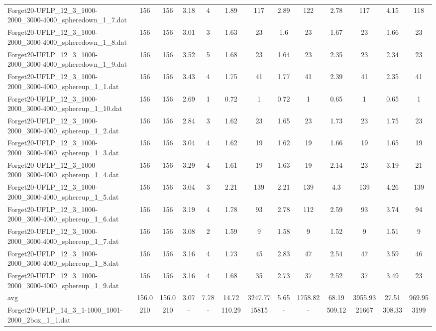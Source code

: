 \begin{table}[!ht]
{\begin{tabular}{lcccccccccccc}
Forget20-UFLP\_12\_3\_1000-2000\_3000-4000\_spheredown\_1\_7.dat & 156 & 156 & 3.18 & 4 & 1.89 & 117 & 2.89 & 122 & 2.78 & 117 & 4.15 & 118 \\
Forget20-UFLP\_12\_3\_1000-2000\_3000-4000\_spheredown\_1\_8.dat & 156 & 156 & 3.01 & 3 & 1.63 & 23 & 1.6 & 23 & 1.67 & 23 & 1.66 & 23 \\
Forget20-UFLP\_12\_3\_1000-2000\_3000-4000\_spheredown\_1\_9.dat & 156 & 156 & 3.52 & 5 & 1.68 & 23 & 1.64 & 23 & 2.35 & 23 & 2.34 & 23 \\
Forget20-UFLP\_12\_3\_1000-2000\_3000-4000\_sphereup\_1\_1.dat & 156 & 156 & 3.43 & 4 & 1.75 & 41 & 1.77 & 41 & 2.39 & 41 & 2.35 & 41 \\
Forget20-UFLP\_12\_3\_1000-2000\_3000-4000\_sphereup\_1\_10.dat & 156 & 156 & 2.69 & 1 & 0.72 & 1 & 0.72 & 1 & 0.65 & 1 & 0.65 & 1 \\
Forget20-UFLP\_12\_3\_1000-2000\_3000-4000\_sphereup\_1\_2.dat & 156 & 156 & 2.84 & 3 & 1.62 & 23 & 1.65 & 23 & 1.73 & 23 & 1.75 & 23 \\
Forget20-UFLP\_12\_3\_1000-2000\_3000-4000\_sphereup\_1\_3.dat & 156 & 156 & 3.04 & 4 & 1.62 & 19 & 1.62 & 19 & 1.66 & 19 & 1.65 & 19 \\
Forget20-UFLP\_12\_3\_1000-2000\_3000-4000\_sphereup\_1\_4.dat & 156 & 156 & 3.29 & 4 & 1.61 & 19 & 1.63 & 19 & 2.14 & 23 & 3.19 & 21 \\
Forget20-UFLP\_12\_3\_1000-2000\_3000-4000\_sphereup\_1\_5.dat & 156 & 156 & 3.04 & 3 & 2.21 & 139 & 2.21 & 139 & 4.3 & 139 & 4.26 & 139 \\
Forget20-UFLP\_12\_3\_1000-2000\_3000-4000\_sphereup\_1\_6.dat & 156 & 156 & 3.19 & 4 & 1.78 & 93 & 2.78 & 112 & 2.59 & 93 & 3.74 & 94 \\
Forget20-UFLP\_12\_3\_1000-2000\_3000-4000\_sphereup\_1\_7.dat & 156 & 156 & 3.08 & 2 & 1.59 & 9 & 1.58 & 9 & 1.52 & 9 & 1.51 & 9 \\
Forget20-UFLP\_12\_3\_1000-2000\_3000-4000\_sphereup\_1\_8.dat & 156 & 156 & 3.16 & 4 & 1.73 & 45 & 2.83 & 47 & 2.54 & 47 & 3.59 & 46 \\
Forget20-UFLP\_12\_3\_1000-2000\_3000-4000\_sphereup\_1\_9.dat & 156 & 156 & 3.16 & 4 & 1.68 & 35 & 2.73 & 37 & 2.52 & 37 & 3.49 & 23 \\
\hline avg & 156.0 & 156.0 & 3.07& 7.78 & 14.72& 3247.77 & 5.65& 1758.82 & 68.19& 3955.93 & 27.51& 969.95\\ \hline
Forget20-UFLP\_14\_3\_1-1000\_1001-2000\_2box\_1\_1.dat & 210 & 210 &  - &  - & 110.29 & 15815 &  - &  - & 509.12 & 21667 & 308.33 & 3199 \\

\end{tabular}}
\end{table}
